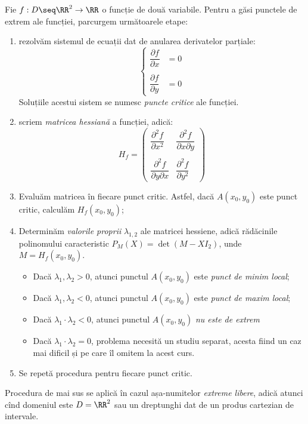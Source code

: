 Fie $ f : D \seq \RR^2 \to \RR $ o funcție de două variabile. Pentru a
găsi punctele de extrem ale funcției, parcurgem următoarele etape:
\begin{enumerate}[(1)]
\item rezolvăm sistemul de ecuații dat de anularea derivatelor parțiale:
  \[
    \begin{cases}
      \dfrac{\partial f}{\partial x} &= 0 \\
      & \\
      \dfrac{\partial f}{\partial y} &= 0
    \end{cases}
  \]
  Soluțiile acestui sistem se numesc \emph{puncte critice} ale funcției.
\item scriem \emph{matricea hessiană} a funcției, adică:
  \[
    H_f =
    \begin{pmatrix}
      \dfrac{\partial^2 f}{\partial x^2} & \dfrac{\partial^2 f}{\partial x \partial y} \\
      & \\
      \dfrac{\partial^2 f}{\partial y \partial x} & \dfrac{\partial^2 f}{\partial y^2}
    \end{pmatrix}
  \]
\item Evaluăm matricea în fiecare punct critic. Astfel, dacă $ A(x_0, y_0) $ este
  punct critic, calculăm $ H_f(x_0, y_0) $;
\item Determinăm \emph{valorile proprii} $ \lambda_{1,2} $ ale matricei hessiene,
  adică rădăcinile polinomului caracteristic $ P_M(X) = \det (M - XI_2) $,
  unde $ M = H_f(x_0, y_0)$.
  \begin{itemize}
  \item Dacă $ \lambda_1, \lambda_2 > 0 $, atunci punctul $ A(x_0, y_0) $
    este \emph{punct de minim local};
  \item Dacă $ \lambda_1, \lambda_2 < 0 $, atunci punctul $ A(x_0, y_0) $
    este \emph{punct de maxim local};
  \item Dacă $ \lambda_1 \cdot \lambda_2 < 0 $, atunci punctul $ A(x_0, y_0) $
    \emph{nu este de extrem}
  \item Dacă $ \lambda_1 \cdot \lambda_2 = 0 $, problema necesită un studiu
    separat, acesta fiind un caz mai dificil și pe care îl omitem la acest curs.
  \end{itemize}
\item Se repetă procedura pentru fiecare punct critic.
\end{enumerate}

Procedura de mai sus se aplică în cazul așa-numitelor \emph{extreme libere},
adică atunci cînd domeniul este $ D = \RR^2 $ sau un dreptunghi dat de un
produs cartezian de intervale.

